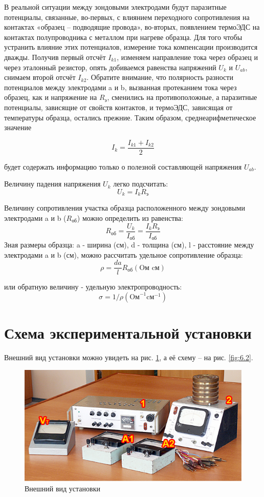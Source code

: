 В реальной ситуации между зондовыми электродами будут паразитные потенциалы, связанные, во-первых, с влиянием
переходного сопротивления на контактах «образец – подводящие провода», во-вторых, появлением термоЭДС на контактах
полупроводника с металлом при нагреве образца. Для того чтобы устранить влияние этих потенциалов, измерение тока
компенсации производится дважды. Получив первый отсчёт $I_{k1}$, изменяем направление тока через образец и через
эталонный резистор, опять добиваемся равенства напряжений $U_k$ и $U_{ab}$, снимаем второй отсчёт $I_{k2}$. Обратите
внимание, что полярность разности потенциалов между электродами a и b, вызванная протеканием тока через образец, как и
напряжение на $R_\text{э}$, сменились на противоположные, а паразитные потенциалы, зависящие от свойств контактов, и
термоЭДС, зависящая от температуры образца, остались прежние. Таким образом, среднеарифметическое значение 

$$I_k=\frac{I_{k1}+I_{k2}}{2}$$

будет содержать информацию только о полезной составляющей напряжения $U_{ab}$.

Величину падения напряжения $U_k$ легко подсчитать:
$$U_{k}=I_{k} R_{\text{э}}$$

Величину сопротивления участка образца расположенного между зондовыми электродами a и b ($R_{\text{об}}$) можно определить из равенства:
$$R_{\text{об}}=\frac{U_{k}}{I_{\text{об}}}=\frac{I_{k} R_{\text{э}}}{I_{\text{об}}}$$
Зная размеры образца: a - ширина (см), d - толщина (см), l - расстояние между электродами a и b (см), можно рассчитать удельное сопротивление образца:
$$\rho=\frac{d a}{l} R_{\text{об}} (\text{Oм} \text{ cм})$$

или обратную величину - удельную электропроводность: 
$$\sigma=1 / \rho\left(\text{Oм}^{-1} \text{cм}^{-1}\right)$$

\section{Схема экспериментальной установки}
Внешний вид установки можно увидеть на рис. \ref{fig:6.1}, а её схему – на рис. \ref{fig:6.2}. 

\begin{figure}[h!]
	\centering
	\includegraphics[width = .9\linewidth]{img/ust.jpg}
	\caption{Внешний вид установки}
	\label{fig:6.1}
\end{figure}

